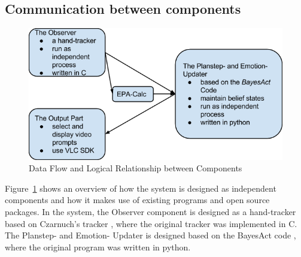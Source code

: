\subsection{Communication between components}

\begin{figure}[h!]
\centering
\includegraphics[width=0.8\linewidth]{fig/dataflow.png}
\caption{Data Flow and Logical Relationship between Components}
\label{fig:dataflow}
\end{figure}

Figure~\ref{fig:dataflow} shows an overview of how the system is designed as independent components and how it makes use of existing programs and open source packages. In the system, the Observer component is designed as a hand-tracker based on Czarnuch's tracker \cite{czarnuch2014}, where the original tracker was implemented in C. The Planstep- and Emotion- Updater is designed based on the BayesAct code \cite{hoey2013bayesian}, where the original program was written in python.


